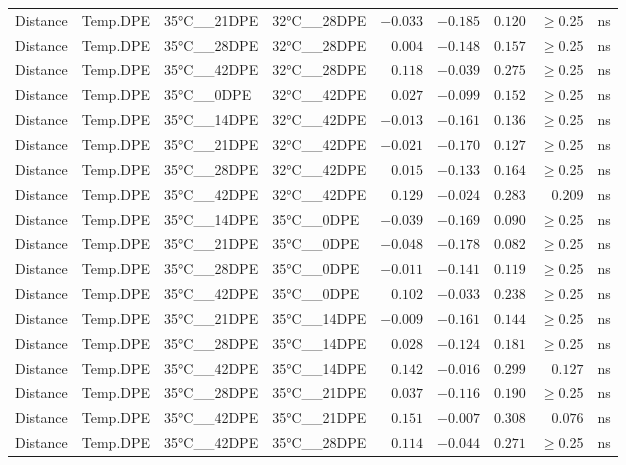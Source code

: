 \documentclass[
]{article}
\begin{document}
\begin{longtable}{llllrrrrl}
Distance & Temp.DPE & 35°C\_\_21DPE & 32°C\_\_28DPE & $-0.033$ & $-0.185$ & $0.120$ & $\geq$0.25 & ns \\ 
Distance & Temp.DPE & 35°C\_\_28DPE & 32°C\_\_28DPE & $0.004$ & $-0.148$ & $0.157$ & $\geq$0.25 & ns \\ 
Distance & Temp.DPE & 35°C\_\_42DPE & 32°C\_\_28DPE & $0.118$ & $-0.039$ & $0.275$ & $\geq$0.25 & ns \\ 
Distance & Temp.DPE & 35°C\_\_0DPE & 32°C\_\_42DPE & $0.027$ & $-0.099$ & $0.152$ & $\geq$0.25 & ns \\ 
Distance & Temp.DPE & 35°C\_\_14DPE & 32°C\_\_42DPE & $-0.013$ & $-0.161$ & $0.136$ & $\geq$0.25 & ns \\ 
Distance & Temp.DPE & 35°C\_\_21DPE & 32°C\_\_42DPE & $-0.021$ & $-0.170$ & $0.127$ & $\geq$0.25 & ns \\ 
Distance & Temp.DPE & 35°C\_\_28DPE & 32°C\_\_42DPE & $0.015$ & $-0.133$ & $0.164$ & $\geq$0.25 & ns \\ 
Distance & Temp.DPE & 35°C\_\_42DPE & 32°C\_\_42DPE & $0.129$ & $-0.024$ & $0.283$ & $0.209$ & ns \\ 
Distance & Temp.DPE & 35°C\_\_14DPE & 35°C\_\_0DPE & $-0.039$ & $-0.169$ & $0.090$ & $\geq$0.25 & ns \\ 
Distance & Temp.DPE & 35°C\_\_21DPE & 35°C\_\_0DPE & $-0.048$ & $-0.178$ & $0.082$ & $\geq$0.25 & ns \\ 
Distance & Temp.DPE & 35°C\_\_28DPE & 35°C\_\_0DPE & $-0.011$ & $-0.141$ & $0.119$ & $\geq$0.25 & ns \\ 
Distance & Temp.DPE & 35°C\_\_42DPE & 35°C\_\_0DPE & $0.102$ & $-0.033$ & $0.238$ & $\geq$0.25 & ns \\ 
Distance & Temp.DPE & 35°C\_\_21DPE & 35°C\_\_14DPE & $-0.009$ & $-0.161$ & $0.144$ & $\geq$0.25 & ns \\ 
Distance & Temp.DPE & 35°C\_\_28DPE & 35°C\_\_14DPE & $0.028$ & $-0.124$ & $0.181$ & $\geq$0.25 & ns \\ 
Distance & Temp.DPE & 35°C\_\_42DPE & 35°C\_\_14DPE & $0.142$ & $-0.016$ & $0.299$ & $0.127$ & ns \\ 
Distance & Temp.DPE & 35°C\_\_28DPE & 35°C\_\_21DPE & $0.037$ & $-0.116$ & $0.190$ & $\geq$0.25 & ns \\ 
Distance & Temp.DPE & 35°C\_\_42DPE & 35°C\_\_21DPE & $0.151$ & $-0.007$ & $0.308$ & $0.076$ & ns \\ 
Distance & Temp.DPE & 35°C\_\_42DPE & 35°C\_\_28DPE & $0.114$ & $-0.044$ & $0.271$ & $\geq$0.25 & ns \\ 

\end{longtable}
\end{document}
